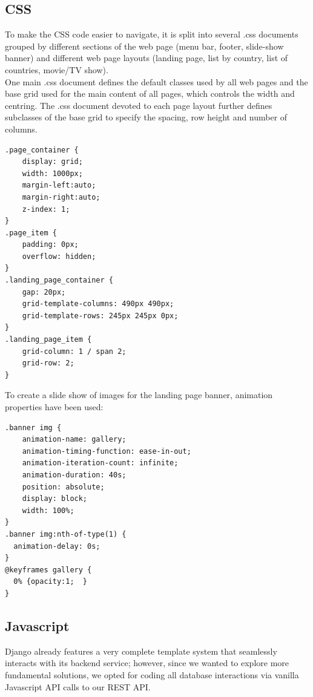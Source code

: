 \documentclass[letterpaper,twocolumn]{article}
\begin{document}
\subsection{CSS}

To make the CSS code easier to navigate, it is split into several .css documents grouped by different sections of the web page (menu bar, footer, slide-show banner) and different web page layouts (landing page, list by country, list of countries, movie/TV show). \\

One main .css document defines the default classes used by all web pages and the base grid used for the main content of all pages, which controls the width and centring. The .css document devoted to each page layout further defines subclasses of the base grid to specify the spacing, row height and number of columns. 

\begin{verbatim}
.page_container {
	display: grid;
	width: 1000px;
	margin-left:auto;
	margin-right:auto;
	z-index: 1;
}
.page_item {
	padding: 0px;
	overflow: hidden;
}
.landing_page_container {
	gap: 20px;
	grid-template-columns: 490px 490px;
	grid-template-rows: 245px 245px 0px;
}
.landing_page_item {
	grid-column: 1 / span 2;
	grid-row: 2;
}
\end{verbatim}
To create a slide show of images for the landing page banner, animation properties have been used:

\begin{verbatim}
.banner img {
	animation-name: gallery;
	animation-timing-function: ease-in-out;
	animation-iteration-count: infinite;
	animation-duration: 40s;
	position: absolute;
	display: block;
	width: 100%;
}
.banner img:nth-of-type(1) {
  animation-delay: 0s;
}
@keyframes gallery {
  0% {opacity:1;  }
}
\end{verbatim}

\subsection{Javascript}

Django already features a very complete template system that seamlessly interacts with its backend service; however, since we wanted to explore more fundamental solutions, we opted for coding all database interactions via vanilla Javascript API calls to our REST API.\\
\end{document}
